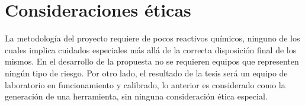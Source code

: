	 
	 

\section{Consideraciones éticas}
	La metodología del proyecto requiere de pocos reactivos químicos, ninguno de los cuales implica cuidados especiales más allá de la correcta disposición final de los mismos. En el desarrollo de la propuesta no se requieren equipos que representen ningún tipo de riesgo. Por otro lado, el resultado de la tesis será un equipo de laboratorio en funcionamiento y calibrado, lo anterior es considerado como la generación de una herramienta, sin ninguna consideración ética especial.